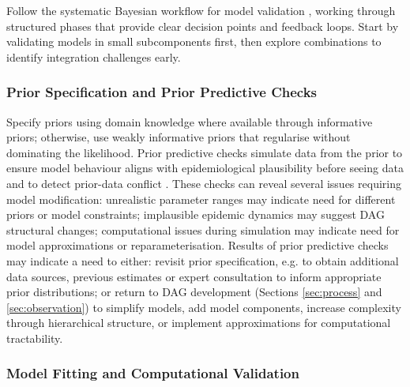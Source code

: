 \documentclass{article}
\begin{document}
Follow the systematic Bayesian workflow for model validation \citep{gelman2020bayesian}, working through structured phases that provide clear decision points and feedback loops.
Start by validating models in small subcomponents first, then explore combinations to identify integration challenges early.

\subsubsection{Prior Specification and Prior Predictive Checks}

Specify priors using domain knowledge where available through informative priors; otherwise, use weakly informative priors that regularise without dominating the likelihood.
Prior predictive checks simulate data from the prior to ensure model behaviour aligns with epidemiological plausibility before seeing data and to detect prior-data conflict \citep{Box1980,yang2025detecting}.
These checks can reveal several issues requiring model modification: unrealistic parameter ranges may indicate need for different priors or model constraints; implausible epidemic dynamics may suggest DAG structural changes; computational issues during simulation may indicate need for model approximations or reparameterisation.
Results of prior predictive checks may indicate a need to either: revisit prior specification, e.g. to obtain additional data sources, previous estimates or expert consultation to inform appropriate prior distributions; or return to DAG development (Sections \ref{sec:process} and \ref{sec:observation}) to simplify models, add model components, increase complexity through hierarchical structure, or implement approximations for computational tractability.

\subsubsection{Model Fitting and Computational Validation}
\end{document}
